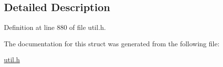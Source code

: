\subsection{Detailed Description}


Definition at line 880 of file util.\+h.



The documentation for this struct was generated from the following file\+:\begin{DoxyCompactItemize}
\item 
\hyperlink{util_8h}{util.\+h}\end{DoxyCompactItemize}
